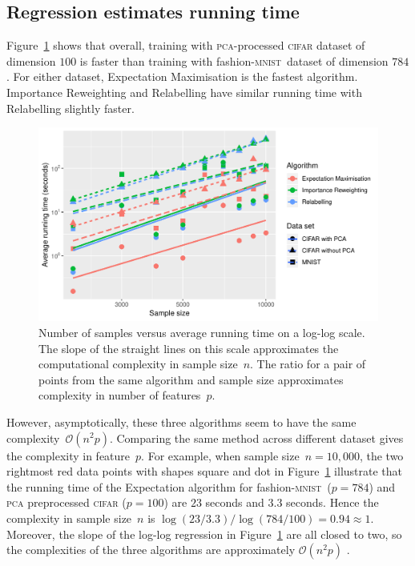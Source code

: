 \documentclass[12pt]{article} %
\newcommand{\mnist}{fashion-\textsc{mnist}}
\begin{document}
\subsection{Regression estimates running time}
Figure~\ref{fig:speed} shows that overall, training with \textsc{pca}-processed \textsc{cifar} dataset of dimension $100$ is faster than training with \mnist\ dataset of dimension $784$. 
For either dataset, Expectation Maximisation is the fastest algorithm. Importance Reweighting and Relabelling have similar running time with Relabelling slightly faster.
\begin{figure}
	\centering
    \includegraphics[scale=.8]{speed}%
	\caption{ Number of samples versus average running time on a log-log scale. The slope of the straight lines on this scale approximates the computational complexity in sample size~$n$. The ratio for a pair of points from the same algorithm and sample size approximates complexity in number of features~$p$.
}
	\label{fig:speed}
\end{figure} 
However, asymptotically, these three algorithms seem to have the same complexity~$\mathcal{O}(n^2p)$. Comparing the same method across different dataset gives the complexity in feature~$p$. For example, when sample size~$n=10,000$, the two rightmost red data points with shapes square and dot in Figure~\ref{fig:speed} illustrate that the running time of the Expectation  algorithm for \mnist\ ($p=784$) and \textsc{pca} preprocessed \textsc{cifar} ($p=100$) are $23$ seconds and $3.3$ seconds. Hence the complexity in sample size~$n$ is 
\begin{math}
    \log(23/3.3)/\log(784/100)=0.94 \approx 1.
\end{math}
Moreover, the slope of the log-log regression in Figure~\ref{fig:speed} are all closed to two, so the complexities of the three algorithms are approximately $\mathcal{O}(n^2p)$ \citep{Roberts:2014:MED:2746455}. 
\end{document}
